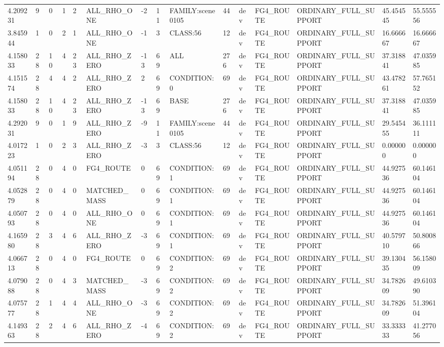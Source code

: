 \begin{tabular}{lllllllllllllll}
4.209231 & 9 & 0 & 1 & 2 & ALL\_RHO\_ONE & -2 & 11 & FAMILY:scene0105 & 44 & dev & FG4\_ROUTE & ORDINARY\_FULL\_SUPPORT & 45.454545 & 55.555556 \\
3.845944 & 1 & 0 & 2 & 1 & ALL\_RHO\_ONE & -1 & 3 & CLASS:56 & 12 & dev & FG4\_ROUTE & ORDINARY\_FULL\_SUPPORT & 16.666667 & 16.666667 \\
4.158033 & 28 & 10 & 4 & 23 & ALL\_RHO\_ZERO & -13 & 69 & ALL & 276 & dev & FG4\_ROUTE & ORDINARY\_FULL\_SUPPORT & 37.318841 & 47.035985 \\
4.151574 & 28 & 4 & 4 & 2 & ALL\_RHO\_ZERO & 2 & 69 & CONDITION:0 & 69 & dev & FG4\_ROUTE & ORDINARY\_FULL\_SUPPORT & 43.478261 & 57.765152 \\
4.158033 & 28 & 10 & 4 & 23 & ALL\_RHO\_ZERO & -13 & 69 & BASE & 276 & dev & FG4\_ROUTE & ORDINARY\_FULL\_SUPPORT & 37.318841 & 47.035985 \\
4.292031 & 9 & 0 & 1 & 9 & ALL\_RHO\_ZERO & -9 & 11 & FAMILY:scene0105 & 44 & dev & FG4\_ROUTE & ORDINARY\_FULL\_SUPPORT & 29.545455 & 36.111111 \\
4.017223 & 1 & 0 & 2 & 3 & ALL\_RHO\_ZERO & -3 & 3 & CLASS:56 & 12 & dev & FG4\_ROUTE & ORDINARY\_FULL\_SUPPORT & 0.000000 & 0.000000 \\
4.051194 & 28 & 0 & 4 & 0 & FG4\_ROUTE & 0 & 69 & CONDITION:1 & 69 & dev & FG4\_ROUTE & ORDINARY\_FULL\_SUPPORT & 44.927536 & 60.146104 \\
4.052879 & 28 & 0 & 4 & 0 & MATCHED\_MASS & 0 & 69 & CONDITION:1 & 69 & dev & FG4\_ROUTE & ORDINARY\_FULL\_SUPPORT & 44.927536 & 60.146104 \\
4.050793 & 28 & 0 & 4 & 0 & ALL\_RHO\_ONE & 0 & 69 & CONDITION:1 & 69 & dev & FG4\_ROUTE & ORDINARY\_FULL\_SUPPORT & 44.927536 & 60.146104 \\
4.165980 & 28 & 3 & 4 & 6 & ALL\_RHO\_ZERO & -3 & 69 & CONDITION:1 & 69 & dev & FG4\_ROUTE & ORDINARY\_FULL\_SUPPORT & 40.579710 & 50.800866 \\
4.066713 & 28 & 0 & 4 & 0 & FG4\_ROUTE & 0 & 69 & CONDITION:2 & 69 & dev & FG4\_ROUTE & ORDINARY\_FULL\_SUPPORT & 39.130435 & 56.158009 \\
4.079088 & 28 & 0 & 4 & 3 & MATCHED\_MASS & -3 & 69 & CONDITION:2 & 69 & dev & FG4\_ROUTE & ORDINARY\_FULL\_SUPPORT & 34.782609 & 49.610390 \\
4.075777 & 28 & 1 & 4 & 4 & ALL\_RHO\_ONE & -3 & 69 & CONDITION:2 & 69 & dev & FG4\_ROUTE & ORDINARY\_FULL\_SUPPORT & 34.782609 & 51.396104 \\
4.149363 & 28 & 2 & 4 & 6 & ALL\_RHO\_ZERO & -4 & 69 & CONDITION:2 & 69 & dev & FG4\_ROUTE & ORDINARY\_FULL\_SUPPORT & 33.333333 & 41.277056 \\

\end{tabular}
